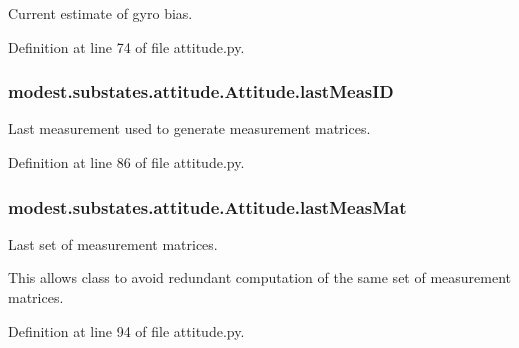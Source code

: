 Current estimate of gyro bias. 



Definition at line 74 of file attitude.\+py.

\subsubsection[{\texorpdfstring{last\+Meas\+ID}{lastMeasID}}]{\setlength{\rightskip}{0pt plus 5cm}modest.\+substates.\+attitude.\+Attitude.\+last\+Meas\+ID}\hypertarget{classmodest_1_1substates_1_1attitude_1_1Attitude_abc1a273c6fd65c839184ae644b68f010}{}\label{classmodest_1_1substates_1_1attitude_1_1Attitude_abc1a273c6fd65c839184ae644b68f010}


Last measurement used to generate measurement matrices. 



Definition at line 86 of file attitude.\+py.

\subsubsection[{\texorpdfstring{last\+Meas\+Mat}{lastMeasMat}}]{\setlength{\rightskip}{0pt plus 5cm}modest.\+substates.\+attitude.\+Attitude.\+last\+Meas\+Mat}\hypertarget{classmodest_1_1substates_1_1attitude_1_1Attitude_add344f4323848f4ccdd9e59d699310a0}{}\label{classmodest_1_1substates_1_1attitude_1_1Attitude_add344f4323848f4ccdd9e59d699310a0}


Last set of measurement matrices. 

This allows class to avoid redundant computation of the same set of measurement matrices. 

Definition at line 94 of file attitude.\+py.

